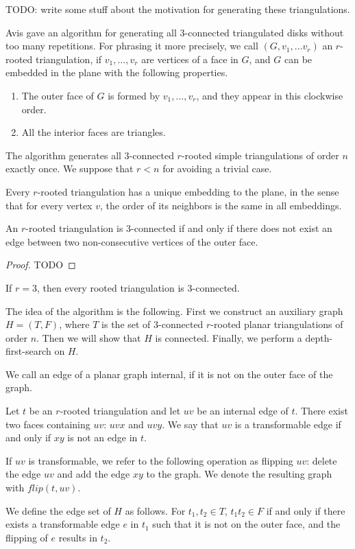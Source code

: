 TODO: write some stuff about the motivation for generating these triangulations.

Avis \cite{algorithm} gave an algorithm for generating all $3$-connected triangulated disks without
too many repetitions. For phrasing it more precisely, we call $(G, v_1, \dots v_r)$
an $r$-rooted triangulation, if $v_1, \dots, v_r$ are vertices of a face in $G$, and $G$
can be embedded in the plane with the following properties.

\begin{enumerate}
  \item The outer face of $G$ is formed by $v_1, \dots, v_r$, and they appear in
  this clockwise order.
  \item All the interior faces are triangles.
\end{enumerate}

The algorithm generates all $3$-connected $r$-rooted simple triangulations of order $n$ exactly once.
We suppose that $r < n$ for avoiding a trivial case.

\begin{remark}
  Every $r$-rooted triangulation has a unique embedding to the plane, in the sense that
  for every vertex $v$, the order of its neighbors is the same in all embeddings.
\end{remark}

\begin{claim} \label{c:3conn}
  An $r$-rooted triangulation is $3$-connected if and only if there does not exist
  an edge between two non-consecutive vertices of the outer face.
\end{claim}
\begin{proof}
  TODO
\end{proof}

\begin{cor}
  If $r = 3$, then every rooted triangulation is $3$-connected.
\end{cor}

The idea of the algorithm is the following. First we construct an auxiliary graph $H = (T, F)$, where
$T$ is the set of $3$-connected $r$-rooted planar triangulations of order $n$. Then we will
show that $H$ is connected. Finally, we perform a depth-first-search on $H$.

\begin{definition}
  We call an edge of a planar graph internal, if it is not on the outer face of the graph.

  Let $t$ be an $r$-rooted triangulation and let $uv$ be an internal edge of $t$. There exist two
  faces containing $uv$: $uvx$ and $uvy$. We say that $uv$ is a transformable edge
  if and only if $xy$ is not an edge in $t$.

  If $uv$ is transformable, we refer to the following operation as flipping $uv$:
  delete the edge $uv$ and add the edge $xy$ to the graph. We denote the resulting
  graph with $flip(t, uv)$.

  We define the edge set of $H$ as follows. For $t_1, t_2 \in T$, $t_1t_2 \in F$ if and only
  if there exists a transformable edge $e$ in $t_1$ such that it is not on the outer face,
  and the flipping of $e$ results in $t_2$.
\end{definition}

